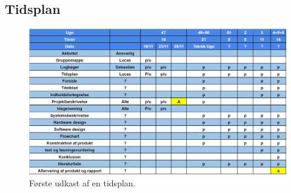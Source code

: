 \subsection{Tidsplan}

\begin{figure}[H]
\centering
\includegraphics[scale=0.8, angle = 90]{Billeder/Tidsplan_23_11_2018}
\caption{Første udkast af en tidsplan.}
\label{fig:tidsplan_1}
\end{figure}